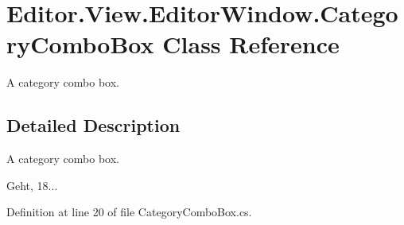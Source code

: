 \section{Editor.\-View.\-Editor\-Window.\-Category\-Combo\-Box Class Reference}
\label{class_editor_1_1_view_1_1_editor_window_1_1_category_combo_box}


A category combo box.  




\subsection{Detailed Description}
A category combo box. 

Geht, 18... 

Definition at line 20 of file Category\-Combo\-Box.\-cs.

